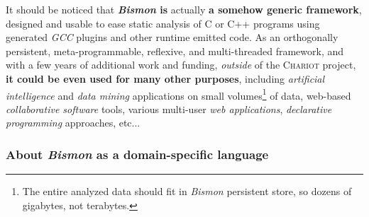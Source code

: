 \bigskip

It should be noticed that \textbf{\emph{Bismon} is} actually \textbf{a
  somehow generic framework},  designed and usable to
ease static analysis of C or C++ programs using generated \emph{GCC}
plugins and other runtime emitted code. As an orthogonally persistent,
meta-programmable, reflexive, and multi-threaded framework, and with a
few years of additional work and funding, \emph{outside} of the
\textsc{Chariot} project, \textbf{it could be even used for many other
  purposes}, including \emph{artificial intelligence} and \emph{data
  mining} applications on small volumes\footnote{The entire analyzed
  data should fit in \emph{Bismon} persistent store, so dozens of
  gigabytes, not terabytes.}  of data, web-based \emph{collaborative
  software} tools, various multi-user \emph{web applications},
\emph{declarative programming} approaches, etc...   
    

\medskip

\subsubsection{About \emph{Bismon} as a domain-specific language}
\label{subsubsec:bismon-dsl}

